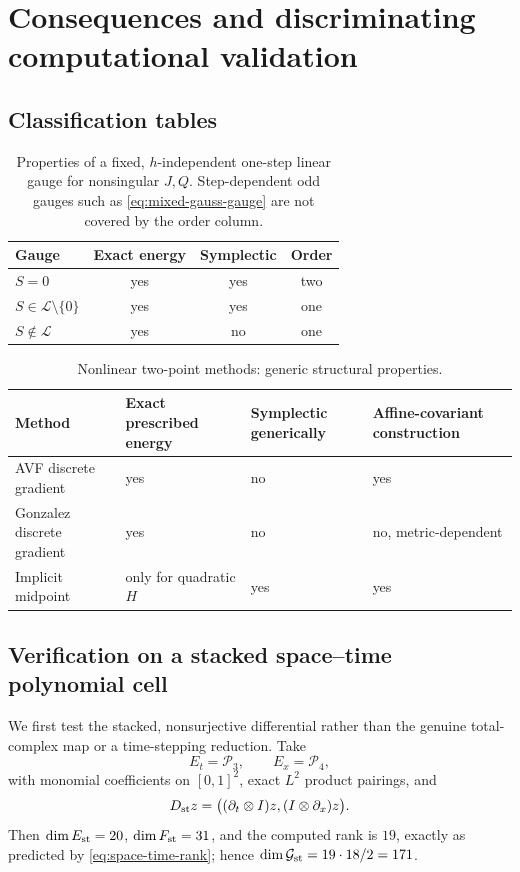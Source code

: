 \documentclass[11pt,a4paper]{article}
\newcommand{\cP}{\mathcal P}
\newcommand{\cL}{\mathcal L}
\begin{document}
\section{Consequences and discriminating computational validation}

\subsection{Classification tables}

\begin{table}[htbp]
\centering
\caption{Properties of a fixed, \(h\)-independent one-step linear gauge
for nonsingular \(J,Q\).  Step-dependent odd gauges such as
\cref{eq:mixed-gauss-gauge} are not covered by the order column.}
\label{tab:gauge}
\begin{tabular}{@{}lccc@{}}
\toprule
Gauge & Exact energy & Symplectic & Order \\ \midrule
\(S=0\) & yes & yes & two \\
\(S\in\cL\setminus\{0\}\) & yes & yes & one \\
\(S\notin\cL\) & yes & no & one \\ \bottomrule
\end{tabular}
\end{table}

\begin{table}[htbp]
\centering
\caption{Nonlinear two-point methods: generic structural properties.}
\label{tab:nonlinear}
\begin{tabularx}{\textwidth}{@{}lYYY@{}}
\toprule
Method & Exact prescribed energy & Symplectic generically
& Affine-covariant construction \\ \midrule
AVF discrete gradient & yes & no & yes \\
Gonzalez discrete gradient & yes & no & no, metric-dependent \\
Implicit midpoint & only for quadratic \(H\) & yes & yes \\ \bottomrule
\end{tabularx}
\end{table}

\subsection{Verification on a stacked space--time polynomial cell}

We first test the stacked, nonsurjective differential rather than the
genuine total-complex map or a time-stepping reduction.  Take
\[
 E_t=\cP_3,\qquad E_x=\cP_4,
\]
with monomial coefficients on \([0,1]^2\), exact \(L^2\) product
pairings, and
\[
 D_{\rm st}z=
 \bigl((\partial_t\otimes I)z,(I\otimes\partial_x)z\bigr).
\]
Then \(\dim E_{\rm st}=20\), \(\dim F_{\rm st}=31\), and the computed
rank is \(19\), exactly as predicted by
\cref{eq:space-time-rank}; hence
\(\dim\mathcal G_{\rm st}=19\cdot18/2=171\).
\end{document}
